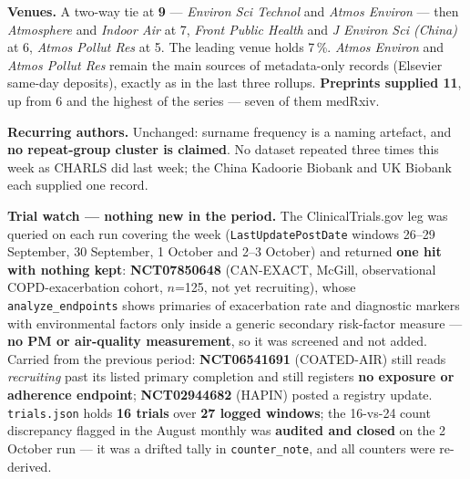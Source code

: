 \documentclass[10pt]{article}
\begin{document}
\footnotesize
\textbf{Venues.} A two-way tie at \textbf{9} --- \textit{Environ Sci Technol} and \textit{Atmos
Environ} --- then \textit{Atmosphere} and \textit{Indoor Air} at 7, \textit{Front Public Health} and
\textit{J Environ Sci (China)} at 6, \textit{Atmos Pollut Res} at 5. The leading venue holds 7\,\%.
\textit{Atmos Environ} and \textit{Atmos Pollut Res} remain the main sources of metadata-only records
(Elsevier same-day deposits), exactly as in the last three rollups. \textbf{Preprints supplied 11}, up
from 6 and the highest of the series --- seven of them medRxiv.

\vspace{1.5mm}
\textbf{Recurring authors.} Unchanged: surname frequency is a naming artefact, and \textbf{no
repeat-group cluster is claimed}. No dataset repeated three times this week as CHARLS did last week;
the China Kadoorie Biobank and UK Biobank each supplied one record.

\vspace{1.5mm}
\textbf{Trial watch --- nothing new in the period.} The ClinicalTrials.gov leg was queried on each run
covering the week (\texttt{LastUpdatePostDate} windows 26--29 September, 30 September, 1 October and
2--3 October) and returned \textbf{one hit with nothing kept}: \textbf{NCT07850648} (CAN-EXACT, McGill,
observational COPD-exacerbation cohort, $n$=125, not yet recruiting), whose \texttt{analyze\_endpoints}
shows primaries of exacerbation rate and diagnostic markers with environmental factors only inside a
generic secondary risk-factor measure --- \textbf{no PM or air-quality measurement}, so it was screened
and not added. Carried from the previous period: \textbf{NCT06541691} (COATED-AIR) still reads
\textit{recruiting} past its listed primary completion and still registers \textbf{no exposure or
adherence endpoint}; \textbf{NCT02944682} (HAPIN) posted a registry update. \texttt{trials.json} holds
\textbf{16 trials} over \textbf{27 logged windows}; the 16-vs-24 count discrepancy flagged in the
August monthly was \textbf{audited and closed} on the 2 October run --- it was a drifted tally in
\texttt{counter\_note}, and all counters were re-derived.
\end{document}

